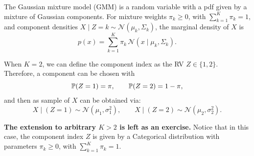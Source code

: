 \begin{example}
	The Gaussian mixture model (GMM) is a random variable with a pdf given by a mixture of Gaussian components. For mixture weights $\pi_k \ge 0$, with $\sum_{k=1}^K \pi_k = 1$, and component
	densities $X \mid Z=k \sim \mathcal{N}(\mu_k,\Sigma_k)$, the marginal density of $X$ is
	\[
	p(x)
	= \sum_{k=1}^K \pi_k \,
	\mathcal{N}(x \mid \mu_k,\Sigma_k).
	\]
	
	When $K=2$, we can define the component index as the RV $Z \in \{1,2\}$. Therefore, a component can be chosen with
	\[
	\mathbb{P}(Z=1)=\pi,\qquad \mathbb{P}(Z=2)=1-\pi,
	\]
	and then as sample of $X$ can be obtained via: 
	\[
	X \mid (Z=1) \sim \mathcal{N}(\mu_1,\sigma_1^2),
	\qquad
	X \mid (Z=2) \sim \mathcal{N}(\mu_2,\sigma_2^2).
	\]

	\textbf{The extension to arbitrary $K>2$ is left as an exercise.} Notice that in this case, the component index $Z$ is given by a Categorical distribution with parameters $\pi_k \ge 0$, with $\sum_{k=1}^K \pi_k = 1$.
\end{example}

















